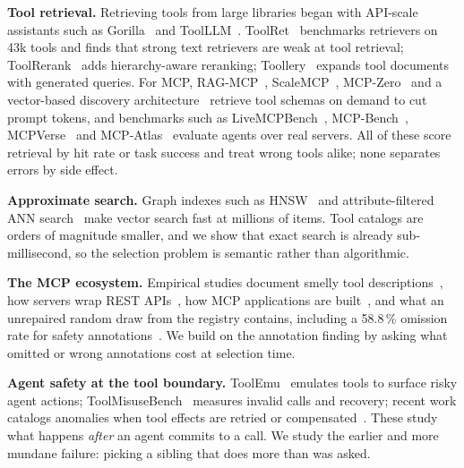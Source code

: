 \textbf{Tool retrieval.} Retrieving tools from large libraries began with API-scale assistants
such as Gorilla~\cite{gorilla} and ToolLLM~\cite{toolllm}. ToolRet~\cite{toolret} benchmarks
retrievers on 43k tools and finds that strong text retrievers are weak at tool retrieval;
ToolRerank~\cite{toolrerank} adds hierarchy-aware reranking; Toollery~\cite{toollery} expands tool
documents with generated queries. For MCP, RAG-MCP~\cite{ragmcp}, ScaleMCP~\cite{scalemcp},
MCP-Zero~\cite{mcpzero} and a vector-based discovery architecture~\cite{semdisc} retrieve tool
schemas on demand to cut prompt tokens, and benchmarks such as LiveMCPBench~\cite{livemcpbench},
MCP-Bench~\cite{mcpbench}, MCPVerse~\cite{mcpverse} and MCP-Atlas~\cite{mcpatlas} evaluate agents
over real servers. All of these score retrieval by hit rate or task success and treat wrong tools
alike; none separates errors by side effect.

\textbf{Approximate search.} Graph indexes such as HNSW~\cite{hnsw} and attribute-filtered ANN
search~\cite{acorn} make vector search fast at millions of items. Tool catalogs are orders of
magnitude smaller, and we show that exact search is already sub-millisecond, so the selection
problem is semantic rather than algorithmic.

\textbf{The MCP ecosystem.} Empirical studies document smelly tool descriptions~\cite{smelly,docs2desc},
how servers wrap REST APIs~\cite{rest2mcp}, how MCP applications are built~\cite{mcpapps}, and what
an unrepaired random draw from the registry contains, including a 58.8\,\% omission rate for safety
annotations~\cite{randomdraw}. We build on the annotation finding by asking what omitted or wrong
annotations cost at selection time.

\textbf{Agent safety at the tool boundary.} ToolEmu~\cite{toolemu} emulates tools to surface risky
agent actions; ToolMisuseBench~\cite{toolmisuse} measures invalid calls and recovery;
recent work catalogs anomalies when tool effects are retried or compensated~\cite{boundary}. These
study what happens \emph{after} an agent commits to a call. We study the earlier and more mundane
failure: picking a sibling that does more than was asked.
